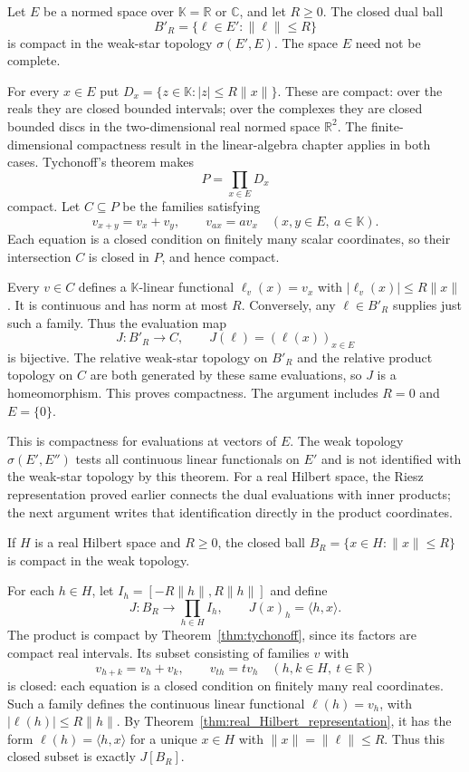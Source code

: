 \begin{theorem}
\label{thm:banach_alaoglu}
Let $E$ be a normed space over $\mathbb K=\mathbb R$ or $\mathbb C$,
and let $R\geq0$. The closed dual ball
\[
B'_R=\{\ell\in E':\|\ell\|\leq R\}
\]
is compact in the weak-star topology $\sigma(E',E)$. The space $E$
need not be complete.
\end{theorem}
\Proof
For every $x\in E$ put
$D_x=\{z\in\mathbb K:|z|\leq R\|x\|\}$. These are compact:
over the reals they are closed bounded intervals; over the complexes
they are closed bounded discs in the two-dimensional real normed space
$\mathbb R^2$. The finite-dimensional compactness result in the
linear-algebra chapter applies in both cases. Tychonoff's theorem makes
\[
P=\prod_{x\in E}D_x
\]
compact. Let $C\subseteq P$ be the families satisfying
\[
v_{x+y}=v_x+v_y,\qquad v_{a x}=a v_x
\quad(x,y\in E,\ a\in\mathbb K).
\]
Each equation is a closed condition on finitely many scalar coordinates,
so their intersection $C$ is closed in $P$, and hence compact.

Every $v\in C$ defines a $\mathbb K$-linear functional
$\ell_v(x)=v_x$ with $|\ell_v(x)|\leq R\|x\|$. It is continuous
and has norm at most $R$. Conversely, any $\ell\in B'_R$ supplies
just such a family. Thus the evaluation map
\[
J:B'_R\longrightarrow C,\qquad J(\ell)=(\ell(x))_{x\in E}
\]
is bijective. The relative weak-star topology on $B'_R$ and the
relative product topology on $C$ are both generated by these same
evaluations, so $J$ is a homeomorphism. This proves compactness.
The argument includes $R=0$ and $E=\{0\}$.
\Done

This is compactness for evaluations at vectors of $E$. The weak topology
$\sigma(E',E'')$ tests all continuous linear functionals on $E'$ and
is not identified with the weak-star topology by this theorem. For a
real Hilbert space, the Riesz representation proved earlier connects the
dual evaluations with inner products; the next argument writes that
identification directly in the product coordinates.

\begin{theorem}
\label{thm:Hilbert_ball_weak_compact}
If $H$ is a real Hilbert space and $R\geq0$, the closed ball
$B_R=\{x\in H:\|x\|\leq R\}$ is compact in the weak topology.
\end{theorem}
\Proof
For each $h\in H$, let $I_h=[-R\|h\|,R\|h\|]$ and define
\[
J:B_R\longrightarrow\prod_{h\in H}I_h,\qquad
J(x)_h=\langle h,x\rangle.
\]
The product is compact by Theorem~\ref{thm:tychonoff}, since its factors
are compact real intervals. Its subset consisting of families $v$ with
\[
v_{h+k}=v_h+v_k,\qquad v_{th}=t v_h
\quad(h,k\in H,\ t\in\mathbb R)
\]
is closed: each equation is a closed condition on finitely many real
coordinates. Such a family defines the continuous linear functional
$\ell(h)=v_h$, with $|\ell(h)|\leq R\|h\|$. By
Theorem~\ref{thm:real_Hilbert_representation}, it has the form
$\ell(h)=\langle h,x\rangle$ for a unique $x\in H$ with
$\|x\|=\|\ell\|\leq R$. Thus this closed subset is exactly $J[B_R]$.

